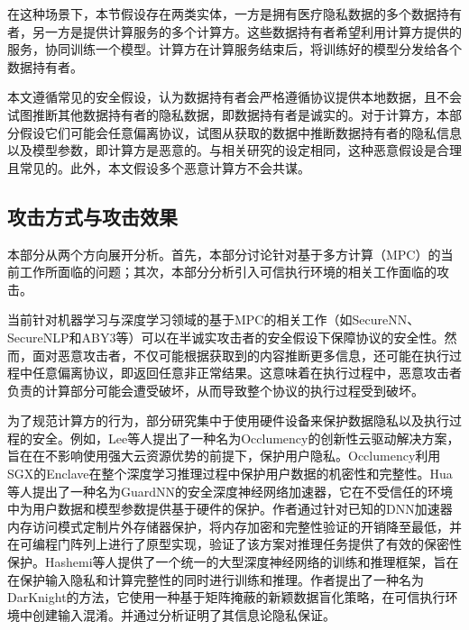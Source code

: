 %

在这种场景下，本节假设存在两类实体，一方是拥有医疗隐私数据的多个数据持有者，另一方是提供计算服务的多个计算方。这些数据持有者希望利用计算方提供的服务，协同训练一个模型。计算方在计算服务结束后，将训练好的模型分发给各个数据持有者。

本文遵循常见的安全假设\cite{SecureNN, SecureNLP}，认为数据持有者会严格遵循协议提供本地数据，且不会试图推断其他数据持有者的隐私数据，即数据持有者是诚实的。对于计算方，本部分假设它们可能会任意偏离协议，试图从获取的数据中推断数据持有者的隐私信息以及模型参数，即计算方是恶意的。与相关研究\cite{Cryptflow}的设定相同，这种恶意假设是合理且常见的。此外，本文假设多个恶意计算方不会共谋。

\subsection{攻击方式与攻击效果}

本部分从两个方向展开分析。首先，本部分讨论针对基于多方计算（MPC）的当前工作所面临的问题；其次，本部分分析引入可信执行环境的相关工作面临的攻击。

当前针对机器学习与深度学习领域的基于MPC的相关工作（如SecureNN\cite{SecureNN}、SecureNLP\cite{SecureNLP}和ABY3\cite{aby3}等）可以在半诚实攻击者的安全假设下保障协议的安全性。然而，面对恶意攻击者，不仅可能根据获取到的内容推断更多信息，还可能在执行过程中任意偏离协议，即返回任意非正常结果\cite{Cryptflow}。这意味着在执行过程中，恶意攻击者负责的计算部分可能会遭受破坏，从而导致整个协议的执行过程受到破坏。

为了规范计算方的行为，部分研究集中于使用硬件设备来保护数据隐私以及执行过程的安全。例如，Lee等人\cite{lee2019occlumency}提出了一种名为Occlumency的创新性云驱动解决方案，旨在在不影响使用强大云资源优势的前提下，保护用户隐私。Occlumency利用SGX的Enclave在整个深度学习推理过程中保护用户数据的机密性和完整性。Hua等人\cite{hua2020guardnn}提出了一种名为GuardNN的安全深度神经网络加速器，它在不受信任的环境中为用户数据和模型参数提供基于硬件的保护。作者通过针对已知的DNN加速器内存访问模式定制片外存储器保护，将内存加密和完整性验证的开销降至最低，并在可编程门阵列上进行了原型实现，验证了该方案对推理任务提供了有效的保密性保护。Hashemi等人\cite{hashemi2020darknight}提供了一个统一的大型深度神经网络的训练和推理框架，旨在在保护输入隐私和计算完整性的同时进行训练和推理。作者提出了一种名为DarKnight的方法，它使用一种基于矩阵掩蔽的新颖数据盲化策略，在可信执行环境中创建输入混淆。并通过分析证明了其信息论隐私保证。

